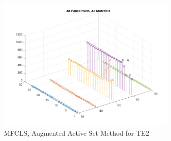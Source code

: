 \documentclass[journal]{IEEEtran}
\begin{document}
\begin{figure}[!h]
    \centering
    \includegraphics[width=3.5in]{mfcls_te2_allmaterials.png}
    \caption{MFCLS, Augmented Active Set Method for TE2}
    \label{fig:mfcls_te2}
\end{figure}

\onecolumn
\end{document}
